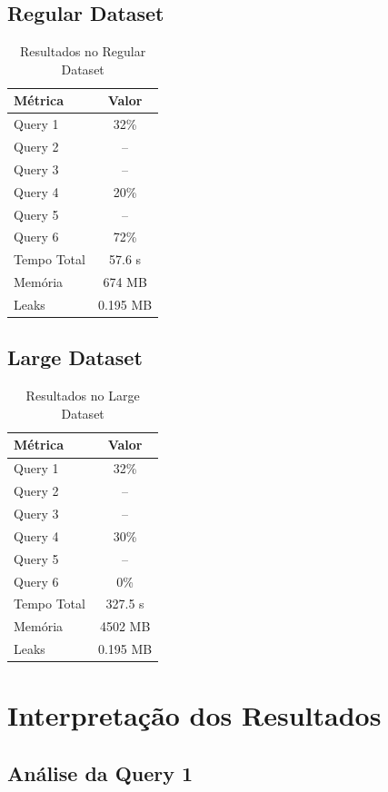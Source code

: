 \documentclass[a4paper,12pt]{scrreprt}
\begin{document}
\subsection{Regular Dataset}

\begin{table}[H]
\centering
\begin{tabular}{|l|c|}
\hline
\textbf{Métrica} & \textbf{Valor} \\
\hline
Query 1 & 32\% \\
Query 2 & -- \\
Query 3 & -- \\
Query 4 & 20\% \\
Query 5 & -- \\
Query 6 & 72\% \\
\hline
Tempo Total & 57.6 s \\
Memória & 674 MB \\
Leaks & 0.195 MB \\
\hline
\end{tabular}
\caption{Resultados no Regular Dataset}
\end{table}

\subsection{Large Dataset}

\begin{table}[H]
\centering
\begin{tabular}{|l|c|}
\hline
\textbf{Métrica} & \textbf{Valor} \\
\hline
Query 1 & 32\% \\
Query 2 & -- \\
Query 3 & -- \\
Query 4 & 30\% \\
Query 5 & -- \\
Query 6 & 0\% \\
\hline
Tempo Total & 327.5 s \\
Memória & 4502 MB \\
Leaks & 0.195 MB \\
\hline
\end{tabular}
\caption{Resultados no Large Dataset}
\end{table}

\section{Interpretação dos Resultados}

\subsection{Análise da Query 1}
\end{document}
